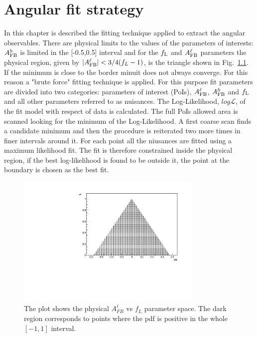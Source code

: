\chapter{Angular fit strategy}

In this chapter is described the fitting technique applied to extract the angular observables.
There are physical limits to the values of the parameters of interests:
$A_{\rm FB}^h$ is limited in the [-0.5,0.5] interval and for the $f_{\rm L}$ and 
$A_{\rm FB}^\ell$ parameters the physical region, given by $|A_{\rm FB}^\ell| < 3/4(f_L-1)$,
is the triangle shown in Fig.~\ref{fig:pdfscan}.
If the minimum is close to the border minuit does not always converge. For this reason
a "brute force" fitting technique is applied. For this purpose fit parameters are
divided into two categories: parameters of interest (PoIs), $A_{\rm FB}^\ell$,
$A_{\rm FB}^h$ and $f_{\rm L}$ and all other parameters referred to as nuisances.
The Log-Likelihood, $log\mathcal{L}$, of the fit model with respect of data is calculated.
The full PoIs allowed area is scanned looking for the minimum of the Log-Likelihood.
A first coarse scan finds a candidate minimum and then the procedure is reiterated two
more times in finer intervals around it. For each point all the niusances are fitted
using a maximum likelihood fit. The fit is therefore constrained inside the physical
region, if the best log-likelihood is found to be outside it, the point at the boundary
is chosen as the best fit. %


\begin{figure}[h!]
\centering
\includegraphics[width=0.8\textwidth]{Lmumu/figs/scan.pdf}
\caption{The plot shows the physical $A_{FB}^\ell$ vs $f_L$ parameter space. The dark region corresponds to points where the pdf is positive in the whole $[-1,1]$ interval. }
\label{fig:pdfscan}
\end{figure}

